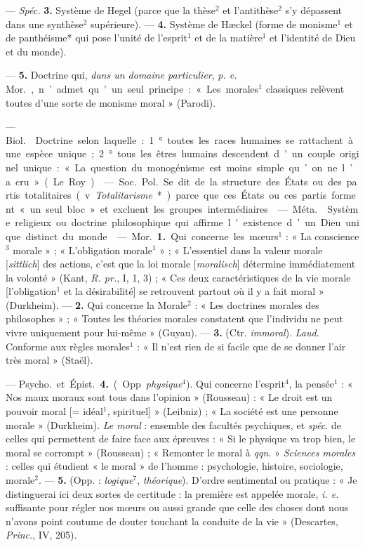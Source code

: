 \begin{itemize}[leftmargin=1cm, label=, itemsep=1pt]
— {\it Spéc.} {\bf 3.} Système de Hegel (parce que la thèse$^2$ et
l’antithèse$^2$ s'y dépassent dans une synthèse$^2$ supérieure). — {\bf 4.}
Système de Hæckel (forme de monisme$^1$ et de panthéisme* qui pose l’unité de
l'esprit$^1$ et de la matière$^1$ et l'identité de Dieu et du monde).

— {\bf 5.} Doctrine qui, {\it dans un domaine particulier}, {\it p. e.}
\si{Mor.}, n’admet qu'un seul principe : « Les morales$^1$ classiques
relèvent toutes d’une sorte de monisme moral » (Parodi).

 — \si{Biol.}  Doctrine selon laquelle : 1°
toutes les races humaines se rattachent à une espèce unique; 2° tous les
êtres humains descendent d’un couple originel unique : « La question du
monogénisme est moins simple qu’on ne l’a cru » (Le Roy).

 — \si{Soc.} \si{Pol.} Se dit de la structure des États ou
des partis totalitaires (v. {\it Totalitarisme}*) parce que ces États ou ces
partis forment « un seul bloc » et excluent les groupes intermédiaires.

 — \si{Méta.}  Système religieux ou doctrine
philosophique qui affirme l'existence d’un Dieu unique distinct du monde.

 — \si{Mor.} {\bf 1.} Qui concerne les mœurs$^1$ : « La
conscience$^3$ morale » ;
« L'obligation morale$^1$ » ; « L’essentiel dans la valeur morale
[{\it sittlich}] des actions, c’est que la loi morale [{\it moralisch}]
détermine immédiatement la volonté » (Kant, {\it R. pr.}, I, 1, 3) ; « Ces
deux caractéristiques de la vie morale [l’obligation$^1$ et la désirabilité]
se retrouvent partout où il y a fait moral » (Durkheim). — {\bf 2.} Qui
concerne la Morale$^2$ : « Les doctrines morales des philosophes » ; « Toutes
les théories morales constatent que l'individu ne peut vivre uniquement pour
lui-même » (Guyau). — {\bf 3.} (Ctr. {\it immoral}). {\it Laud.} Conforme aux
règles morales$^1$ : « Il n’est rien de si facile que de se donner l'air très
moral » (Staël).

— \si{Psycho.} et \si{Épist.} {\bf 4.} (Opp. {\it physique}$^4$). Qui concerne
l’esprit$^4$, la pensée$^1$ : « Nos maux moraux sont tous dans
l'opinion » (Rousseau) : « Le droit est un pouvoir moral [= idéal$^1$,
spirituel] » (Leibniz) ; « La société est une personne morale » (Durkheim).
{\it Le moral} : ensemble des facultés psychiques, et {\it spéc.} de celles
qui permettent de faire face aux épreuves : « Si le physique va trop bien, le
moral se corrompt » (Rousseau) ; « Remonter le moral à {\it qqn.} »
{\it Sciences morales} : celles qui étudient « le moral » de l’homme :
psychologie, histoire, sociologie, morale$^2$. — {\bf 5.} (Opp. :
{\it logique}$^7$, {\it théorique}). D'ordre sentimental ou pratique : « Je
distinguerai ici deux sortes de certitude : la première est appelée morale,
{\it i. e.} suffisante pour régler nos mœurs ou aussi grande que celle des
choses dont nous n'avons point coutume de douter touchant la conduite de la
vie » (Descartes, {\it Princ.}, IV, 205).


\end{itemize}
